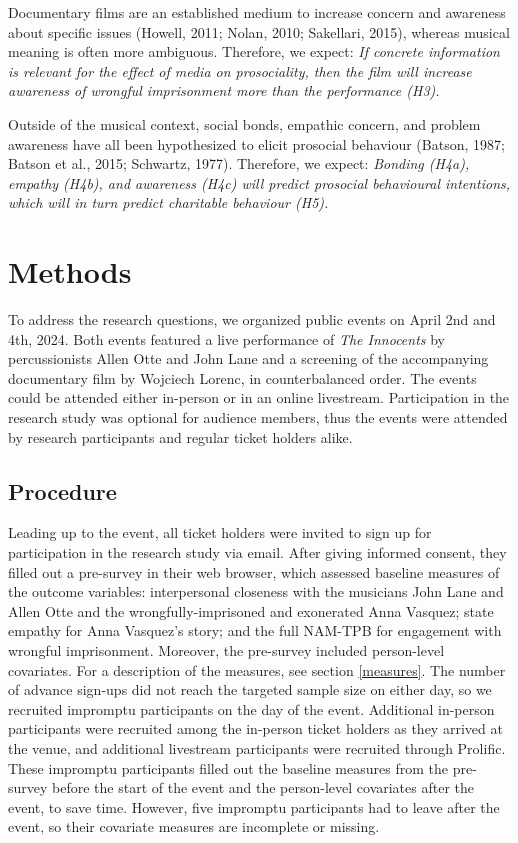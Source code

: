 \documentclass[
  man,floatsintext]{apa6}
\begin{document}
Documentary films are an established medium to increase concern and awareness about specific issues (Howell, 2011; Nolan, 2010; Sakellari, 2015), whereas musical meaning is often more ambiguous. Therefore, we expect: \emph{If concrete information is relevant for the effect of media on prosociality, then the film will increase awareness of wrongful imprisonment more than the performance (H3).}

Outside of the musical context, social bonds, empathic concern, and problem awareness have all been hypothesized to elicit prosocial behaviour (Batson, 1987; Batson et al., 2015; Schwartz, 1977). Therefore, we expect: \emph{Bonding (H4a), empathy (H4b), and awareness (H4c) will predict prosocial behavioural intentions, which will in turn predict charitable behaviour (H5).}

\section{Methods}\label{methods}

To address the research questions, we organized public events on April 2nd and 4th, 2024. Both events featured a live performance of \textit{The Innocents} by percussionists Allen Otte and John Lane and a screening of the accompanying documentary film by Wojciech Lorenc, in counterbalanced order. The events could be attended either in-person or in an online livestream. Participation in the research study was optional for audience members, thus the events were attended by research participants and regular ticket holders alike.

\subsection{Procedure}\label{procedure}

Leading up to the event, all ticket holders were invited to sign up for participation in the research study via email. After giving informed consent, they filled out a pre-survey in their web browser, which assessed baseline measures of the outcome variables: interpersonal closeness with the musicians John Lane and Allen Otte and the wrongfully-imprisoned and exonerated Anna Vasquez; state empathy for Anna Vasquez's story; and the full NAM-TPB for engagement with wrongful imprisonment. Moreover, the pre-survey included person-level covariates. For a description of the measures, see section \ref{measures}. The number of advance sign-ups did not reach the targeted sample size on either day, so we recruited impromptu participants on the day of the event. Additional in-person participants were recruited among the in-person ticket holders as they arrived at the venue, and additional livestream participants were recruited through Prolific. These impromptu participants filled out the baseline measures from the pre-survey before the start of the event and the person-level covariates after the event, to save time. However, five impromptu participants had to leave after the event, so their covariate measures are incomplete or missing.
\end{document}
